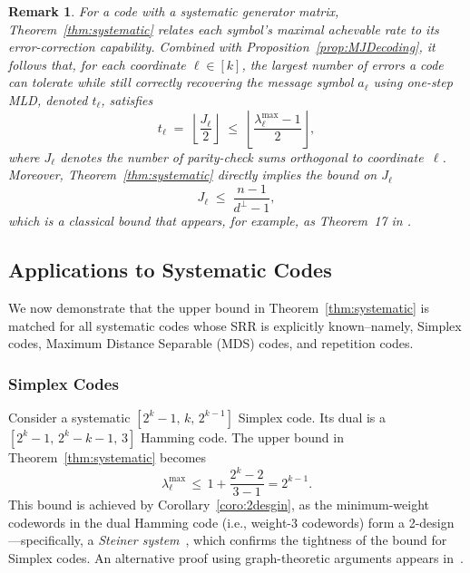 \documentclass[conference,letterpaper]{IEEEtran}
\newtheorem{remark}{Remark}
\begin{document}
\begin{remark}
  For a code with a systematic generator matrix,
  Theorem~\ref{thm:systematic} relates each symbol’s
  \emph{maximal achevable rate} to its \emph{error-correction capability}.
  Combined with Proposition~\ref{prop:MJDecoding}, it follows that, for each coordinate $\ell\in[k]$, the largest number of errors a code can tolerate while still correctly recovering the message symbol $a_\ell$ using one-step MLD, denoted $t_{\ell}$, satisfies
  \[
     t_\ell \;=\;
     \left\lfloor \frac{J_\ell}{2} \right\rfloor
     \;\le\;
     \left\lfloor \frac{\lambda_{\ell}^{\max}-1}{2} \right\rfloor ,
  \]
  where $J_\ell$ denotes the number of parity-check sums orthogonal to
  coordinate~$\ell$. Moreover, Theorem~\ref{thm:systematic} directly implies the bound on $J_{\ell}$
  \[
     J_\ell \;\le\; \frac{n-1}{d^{\perp}-1},
  \]
  which is a classical bound that appears, for example, as Theorem~17 in
  \cite[Ch.~13]{Coding:books/MacWilliamsS77}.
\end{remark}

\subsection{Applications to Systematic Codes}
We now demonstrate that the upper bound in Theorem~\ref{thm:systematic} is matched for all systematic codes whose SRR is explicitly known--namely, Simplex codes, Maximum Distance Separable (MDS) codes, and repetition codes.
    \subsubsection{Simplex Codes} Consider a systematic \( [2^k - 1,\, k,\, 2^{k-1}] \) Simplex code. Its dual is a \( [2^k - 1,\, 2^k - k - 1,\, 3] \) Hamming code. The upper bound in Theorem~\ref{thm:systematic} becomes
    \[
    \lambda_{\ell}^{\max} \,\le\, 1 + \frac{2^k - 2}{3-1} = 2^{k-1}.
    \]
This bound is achieved by Corollary~\ref{coro:2desgin}, as the minimum-weight codewords in the dual Hamming code (i.e., weight-3 codewords) form a 2-design—specifically, a \emph{Steiner system}~\cite[Theorem 10.25]{CombiDesigns:books/daglib/Stinson04}, which confirms the tightness of the bound for Simplex codes. An alternative proof using graph-theoretic arguments appears in~\cite{SRR:conf/isit/KazemiKSS20, SRR:journals/tit/AktasJKKS21}.
    
\end{document}
